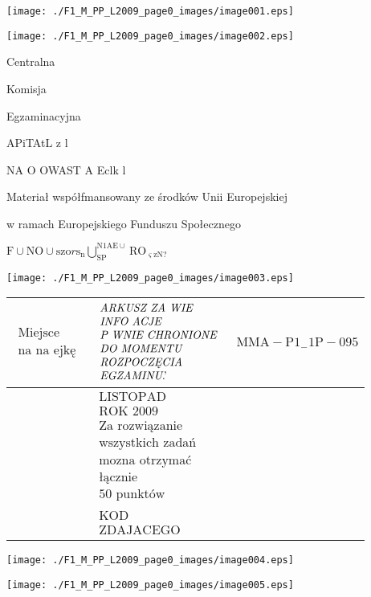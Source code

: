 \documentclass[a4paper,12pt]{article}
\begin{document}
\begin{center}
\texttt{[image: ./F1\_M\_PP\_L2009\_page0\_images/image001.eps]}

\texttt{[image: ./F1\_M\_PP\_L2009\_page0\_images/image002.eps]}
\end{center}
Centralna

Komisja

Egzaminacyjna

APiTAtL z l

NA O OWAST A Eclk l

Materiał współfmansowany ze środków Unii Europejskiej

w ramach Europejskiego Funduszu Społecznego

$\displaystyle \mathrm{F}\cup \mathrm{N}\mathrm{O}\cup \mathrm{s}\mathrm{z}\mathrm{o}r\mathrm{s}_{\mathrm{n}}\bigcup_{\mathrm{S}\mathrm{P}}^{\mathrm{N}1\mathrm{A}\mathrm{E}\cup}\mathrm{R}\mathrm{O}_{\varsigma \mathrm{z}\mathrm{N}?}$
\begin{center}
\texttt{[image: ./F1\_M\_PP\_L2009\_page0\_images/image003.eps]}

\begin{tabular}{|l|l|l}
\cline{1-1}
\multicolumn{1}{|l|}{$\begin{array}{l}\mbox{Miejsce}	\\	\mbox{na na ejkę}	\end{array}$}&	\multicolumn{1}{|l|}{$\begin{array}{l}\mbox{{\it ARKUSZ ZA WIE}}	\\	\mbox{{\it INFO ACJE}}	\\	\mbox{{\it P WNIE CHRONIONE}}	\\	\mbox{{\it DO MOMENTU}}	\\	\mbox{{\it ROZPOCZĘCIA}}	\\	\mbox{{\it EGZAMINU}.'}	\end{array}$}&	\multicolumn{1}{|l}{ $\mathrm{M}\mathrm{M}\mathrm{A}-\mathrm{P}1_{-}1\mathrm{P}-095$}	\\
\hline
&	\multicolumn{1}{|l}{$\begin{array}{l}\mbox{LISTOPAD}	\\	\mbox{ROK 2009}	\\	\mbox{Za rozwiązanie}	\\	\mbox{wszystkich zadań}	\\	\mbox{mozna otrzymać}	\\	\mbox{łącznie}	\\	\mbox{50 punktów}	\end{array}$}	\\
\cline{3-3}
&	\multicolumn{1}{|l}{$\begin{array}{l}\mbox{KOD}	\\	\mbox{ZDAJACEGO}	\end{array}$}
\end{tabular}


\texttt{[image: ./F1\_M\_PP\_L2009\_page0\_images/image004.eps]}

\texttt{[image: ./F1\_M\_PP\_L2009\_page0\_images/image005.eps]}
\end{center}
\end{document}
